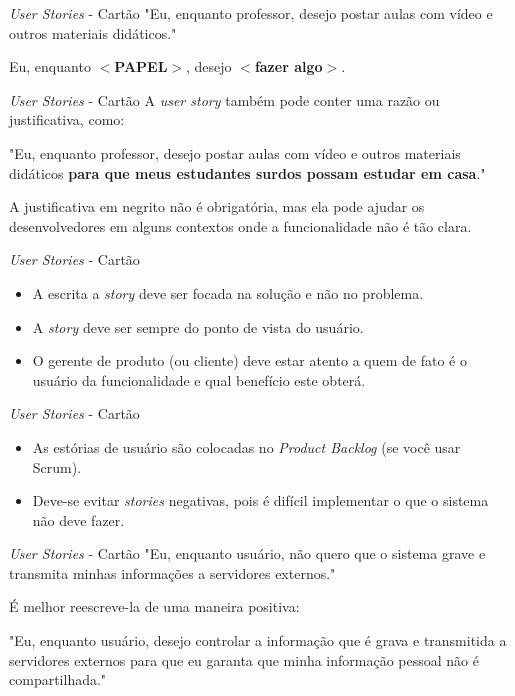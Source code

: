 \documentclass[11pt]{beamer}
\begin{document}
   \begin{frame}{\textit{User Stories} - Cartão}
      "Eu, enquanto professor, desejo postar aulas com vídeo e outros materiais didáticos."
\vspace{1cm}

      Eu, enquanto \textbf{$<$PAPEL$>$}, desejo \textbf{$<$fazer algo$>$}.
   \end{frame}

   \begin{frame}{\textit{User Stories} - Cartão}
      A \textit{user story} também pode conter uma razão ou justificativa, como:
\vspace{1cm}
       
      "Eu, enquanto professor, desejo postar aulas com vídeo e outros materiais didáticos \textbf{para que meus estudantes surdos possam estudar em casa}."
\vspace{1cm}

      A justificativa em negrito não é obrigatória, mas ela pode ajudar os desenvolvedores em alguns contextos onde a funcionalidade não é tão clara.
   \end{frame}

   \begin{frame}{\textit{User Stories} - Cartão}
      \begin{itemize}
         \item A escrita a \textit{story} deve ser focada na solução e não no problema.
         \item A \textit{story} deve ser sempre do ponto de vista do usuário.
         \item O gerente de produto (ou cliente) deve estar atento a quem de fato é o usuário da funcionalidade e qual benefício este obterá.
      \end{itemize}
   \end{frame}

   \begin{frame}{\textit{User Stories} - Cartão}
      \begin{itemize}
         \item As estórias de usuário são colocadas no \textit{Product Backlog} (se você usar Scrum).
         \item Deve-se evitar \textit{stories} negativas, pois é difícil implementar o que o sistema não deve fazer.
      \end{itemize}
   \end{frame}

   \begin{frame}{\textit{User Stories} - Cartão}
       "Eu, enquanto usuário, não quero que o sistema grave e transmita minhas informações a servidores externos."
\vspace{1cm}
       
       É melhor reescreve-la de uma maneira positiva:
\vspace{.5cm}
       
       "Eu, enquanto usuário, desejo controlar a informação que é grava e transmitida a servidores externos para que eu garanta que minha informação pessoal não é compartilhada."
    \end{frame}
\end{document}

